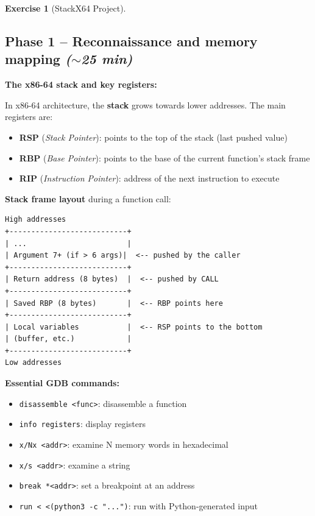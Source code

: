 \documentclass[a4paper,11pt]{article}
\theoremstyle{plain}
\theoremstyle{definition}
\newtheorem{exercice}{Exercise}
\begin{document}
\begin{exercice}[StackX64 Project]$\;$


\subsection*{Phase 1 -- Reconnaissance and memory mapping \hfill\normalfont\textit{($\sim$25 min)}}

\begin{rappel}
\textbf{The x86-64 stack and key registers:}

In x86-64 architecture, the \textbf{stack} grows towards lower addresses. The main registers are:
\begin{itemize}
    \item \textbf{RSP} (\textit{Stack Pointer}): points to the top of the stack (last pushed value)
    \item \textbf{RBP} (\textit{Base Pointer}): points to the base of the current function's stack frame
    \item \textbf{RIP} (\textit{Instruction Pointer}): address of the next instruction to execute
\end{itemize}

\medskip
\textbf{Stack frame layout} during a function call:
\begin{lstlisting}[style=GDBStyle]
High addresses
+---------------------------+
| ...                       |
| Argument 7+ (if > 6 args)|  <-- pushed by the caller
+---------------------------+
| Return address (8 bytes)  |  <-- pushed by CALL
+---------------------------+
| Saved RBP (8 bytes)       |  <-- RBP points here
+---------------------------+
| Local variables           |  <-- RSP points to the bottom
| (buffer, etc.)            |
+---------------------------+
Low addresses
\end{lstlisting}

\medskip
\textbf{Essential GDB commands:}
\begin{itemize}
    \item \texttt{disassemble <func>}: disassemble a function
    \item \texttt{info registers}: display registers
    \item \texttt{x/Nx <addr>}: examine N memory words in hexadecimal
    \item \texttt{x/s <addr>}: examine a string
    \item \texttt{break *<addr>}: set a breakpoint at an address
    \item \texttt{run < <(python3 -c "...")}: run with Python-generated input
\end{itemize}
\end{rappel}


\end{exercice}
\end{document}
